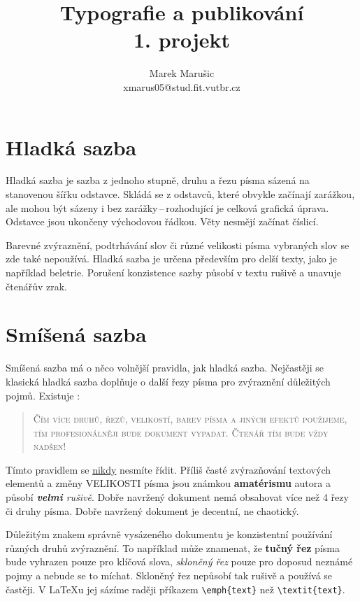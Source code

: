 \documentclass[twocolumn,11pt,a4paper]{article}
\title{Typografie a publikování \\ 1. projekt}
\author{Marek Marušic \\ xmarus05@stud.fit.vutbr.cz}
\date{}
\begin{document}
\maketitle

\section{Hladká sazba}

Hladká sazba je sazba z jednoho stupně, druhu a řezu písma sázená na stanovenou šířku odstavce. Skládá se z odstavců, které obvykle začínají zarážkou, ale mohou být sázeny i bez zarážky\,--\,rozhodující je celková grafická úprava. Odstavce jsou ukončeny východovou řádkou. Věty nesmějí začínat číslicí.

Barevné zvýraznění, podtrhávání slov či různé velikosti písma vybraných slov se zde také nepoužívá. Hladká sazba je určena především pro delší texty, jako je například beletrie. Porušení konzistence sazby působí v textu rušivě a unavuje čtenářův zrak.

\section{Smíšená sazba}

Smíšená sazba má o něco volnější pravidla, jak hladká sazba. Nejčastěji se klasická hladká sazba doplňuje o další řezy písma pro zvýraznění důležitých pojmů. Existuje :

\begin{quotation}
 \scshape Čím více druhů, řezů, velikostí, barev písma a jiných efektů použijeme, tím profesionálněji bude  dokument vypadat. Čtenář tím bude vždy nadšen!
\end{quotation}

{Tímto pravidlem se \underline{nikdy} nesmíte řídit. Příliš časté zvýrazňování textových elementů a změny \Huge V\LARGE E\Large L\large I\normalsize K\small O\footnotesize S\scriptsize T\tiny I \normalsize písma \Large jsou \LARGE známkou \Huge \textbf{ amatérismu} \normalsize autora a působí \emph{\textbf{ velmi} rušivě}. Dobře navržený dokument nemá obsahovat více než 4 řezy či druhy písma. \ttfamily Dobře navržený dokument je decentní, ne chaotický.}

Důležitým znakem správně vysázeného dokumentu je konzistentní používání různých druhů zvýraznění. To například může znamenat, že \textbf{tučný řez} písma bude vyhrazen pouze pro klíčová slova, \emph{skloněný řez} pouze pro doposud neznámé pojmy a nebude se to míchat. Skloněný řez nepůsobí tak rušivě a používá se častěji. V \LaTeX u jej sázíme raději příkazem \verb|\emph{text}| než \verb|\textit{text}|.
\end{document}
